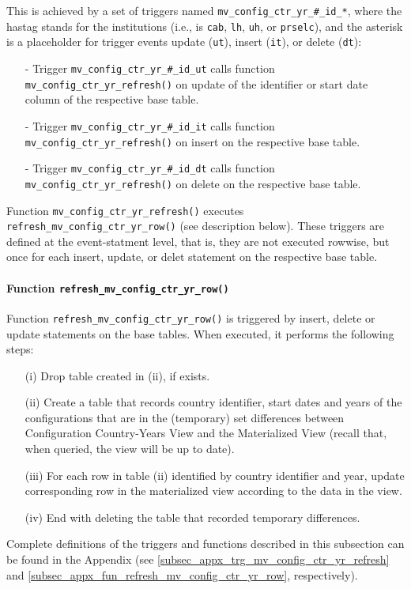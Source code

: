 This is achieved by a set of triggers named \texttt{mv\_config\_ctr\_yr\_\#\_id\_*}, where the hastag stands for the institutions (i.e., is \texttt{cab}, \texttt{lh}, \texttt{uh}, or \texttt{prselc}), and the asterisk is a placeholder for trigger events update (\texttt{ut}), insert (\texttt{it}), or delete (\texttt{dt}):
\begin{itemize}
\item[-]Trigger \texttt{mv\_config\_ctr\_yr\_\#\_id\_ut} calls function \texttt{mv\_config\_ctr\_yr\_refresh()} on update of the identifier or start date column of the respective base table.
\item[-]Trigger \texttt{mv\_config\_ctr\_yr\_\#\_id\_it} calls function \texttt{mv\_config\_ctr\_yr\_refresh()} on insert on the respective base table.
\item[-]Trigger \texttt{mv\_config\_ctr\_yr\_\#\_id\_dt} calls function \texttt{mv\_config\_ctr\_yr\_refresh()} on delete on the respective base table.
\end{itemize}
Function  \texttt{mv\_config\_ctr\_yr\_refresh()} executes \texttt{refresh\_mv\_config\_ctr\_yr\_row()} (see description below).
These triggers are defined at the event-statment level, that is, they are not executed rowwise, but once for each insert, update, or delet statement on the respective base table.

\paragraph{Function \texttt{refresh\_mv\_config\_ctr\_yr\_row()}}
Function \texttt{refresh\_mv\_config\_ctr\_yr\_row()} is triggered by insert, delete or update statements on the base tables.
When executed, it performs the following steps:
\begin{itemize}
\item[(i)] Drop table created in (ii), if exists. 
\item[(ii)] Create a table that records country identifier, start dates and years of the configurations that are in the (temporary) set differences between Configuration Country-Years View and the Materialized View (recall that, when queried, the view will be up to date).
\item[(iii)] For each row in table (ii) identified by country identifier and year, update corresponding row in the materialized view according to the data in the view.
\item[(iv)] End with deleting the table that recorded temporary differences.
\end{itemize}

Complete definitions of the triggers and functions described in this subsection can be found in the Appendix (see \ref{subsec_appx_trg_mv_config_ctr_yr_refresh} and \ref{subsec_appx_fun_refresh_mv_config_ctr_yr_row}, respectively).  